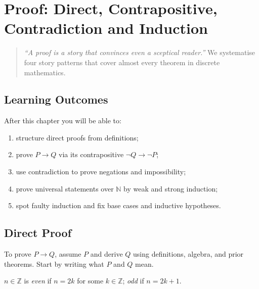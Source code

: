 \chapter[Proof]{Proof: Direct, Contrapositive, Contradiction and Induction}
\label{ch:proof}

\begin{quote}
\emph{``A proof is a story that convinces even a sceptical reader.''} We systematise four story patterns that cover almost every theorem in discrete mathematics.
\end{quote}

\noindent{}
\vspace{0.4em}

\section*{Learning Outcomes}
After this chapter you will be able to:
\begin{enumerate}[label=(L\arabic*)]
    \item structure direct proofs from definitions;
    \item prove $P\to Q$ via its contrapositive $\neg Q\to\neg P$;
    \item use contradiction to prove negations and impossibility;
    \item prove universal statements over $\mathbb{N}$ by weak and strong induction;
    \item spot faulty induction and fix base cases and inductive hypotheses.
\end{enumerate}

\section{Direct Proof}
\label{sec:direct}
To prove $P\to Q$, assume $P$ and derive $Q$ using definitions, algebra, and prior theorems. Start by writing what $P$ and $Q$ mean.

\begin{definition}
$n\in\mathbb{Z}$ is \emph{even} if $n=2k$ for some $k\in\mathbb{Z}$; \emph{odd} if $n=2k+1$.
\end{definition}

